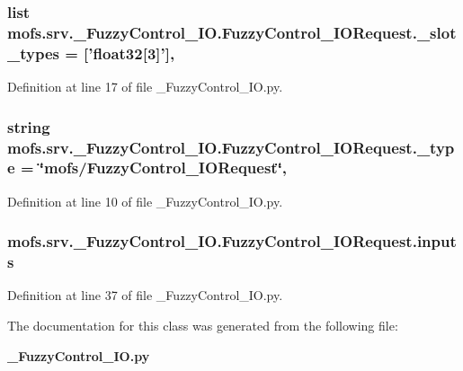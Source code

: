 \subsubsection[{\-\_\-slot\-\_\-types}]{\setlength{\rightskip}{0pt plus 5cm}list mofs.\-srv.\-\_\-\-Fuzzy\-Control\-\_\-\-I\-O.\-Fuzzy\-Control\-\_\-\-I\-O\-Request.\-\_\-slot\-\_\-types = ['float32[3]']\hspace{0.3cm}{\ttfamily [static]}, {\ttfamily [private]}}\label{classmofs_1_1srv_1_1__FuzzyControl__IO_1_1FuzzyControl__IORequest_ad0cce3b41c3ee5f0a04b682a1d1494ed}


Definition at line 17 of file \-\_\-\-Fuzzy\-Control\-\_\-\-I\-O.\-py.

\subsubsection[{\-\_\-type}]{\setlength{\rightskip}{0pt plus 5cm}string mofs.\-srv.\-\_\-\-Fuzzy\-Control\-\_\-\-I\-O.\-Fuzzy\-Control\-\_\-\-I\-O\-Request.\-\_\-type = \char`\"{}mofs/{\bf Fuzzy\-Control\-\_\-\-I\-O\-Request}\char`\"{}\hspace{0.3cm}{\ttfamily [static]}, {\ttfamily [private]}}\label{classmofs_1_1srv_1_1__FuzzyControl__IO_1_1FuzzyControl__IORequest_ad3044018c91643173e446fd744917bce}


Definition at line 10 of file \-\_\-\-Fuzzy\-Control\-\_\-\-I\-O.\-py.

\subsubsection[{inputs}]{\setlength{\rightskip}{0pt plus 5cm}mofs.\-srv.\-\_\-\-Fuzzy\-Control\-\_\-\-I\-O.\-Fuzzy\-Control\-\_\-\-I\-O\-Request.\-inputs}\label{classmofs_1_1srv_1_1__FuzzyControl__IO_1_1FuzzyControl__IORequest_a158fae99f479ce7650bf542b61749d89}


Definition at line 37 of file \-\_\-\-Fuzzy\-Control\-\_\-\-I\-O.\-py.



The documentation for this class was generated from the following file\-:\begin{DoxyCompactItemize}
\item 
{\bf \-\_\-\-Fuzzy\-Control\-\_\-\-I\-O.\-py}\end{DoxyCompactItemize}
